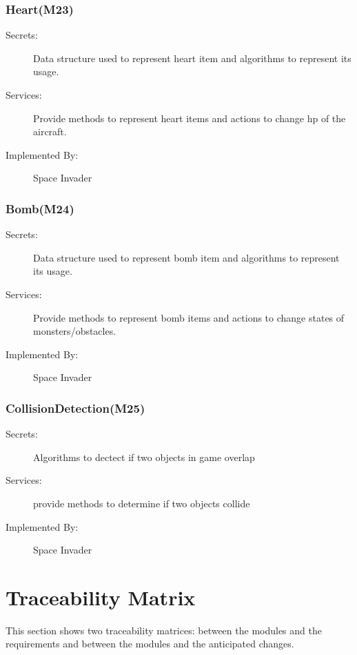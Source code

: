 \documentclass[12pt]{article}
\begin{document}
\subsubsection{Heart(M23)}
\begin{description}
\item[Secrets:] Data structure used to represent heart item and algorithms to represent its usage.
\item[Services:] Provide methods to represent heart items and actions to change hp of the aircraft. 
\item[Implemented By:] Space Invader
\end{description}

\subsubsection{Bomb(M24)}
\begin{description}
\item[Secrets:] Data structure used to represent bomb item and algorithms to represent its usage.
\item[Services:] Provide methods to represent bomb items and actions to change states of monsters/obstacles. 
\item[Implemented By:] Space Invader
\end{description}

\subsubsection{CollisionDetection(M25)}
\begin{description}
\item[Secrets:] Algorithms to dectect if two objects in game overlap
\item[Services:] provide methods to determine if two objects collide
\item[Implemented By:] Space Invader
\end{description}
\newpage
\section{Traceability Matrix} \label{SecTM}
This section shows two traceability matrices: between the modules and the
requirements and between the modules and the anticipated changes.
\end{document}
